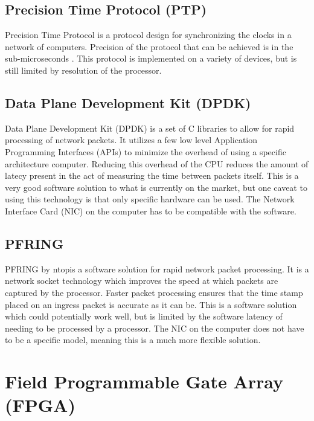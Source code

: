 \subsection{Precision Time Protocol (PTP)}

Precision Time Protocol is a protocol design for synchronizing the clocks in a network of computers.
Precision of the protocol that can be achieved is in the sub-microseconds \cite{ieee1588}. 
This protocol is implemented on a variety of devices, but is still limited by resolution of the processor.

\subsection{Data Plane Development Kit (DPDK)}

\par Data Plane Development Kit (DPDK) is a set of C libraries to allow for rapid processing of network packets.
It utilizes a few low level Application Programming Interfaces (APIs) to minimize the overhead of using a specific architecture computer.
Reducing this overhead of the CPU reduces the amount of latecy present in the act of measuring the time between packets itself.
This is a very good software solution to what is currently on the market, but one caveat to using this technology is that only specific hardware can be used.
The Network Interface Card (NIC) on the computer has to be compatible with the software.

\subsection{PF\textunderscore RING}

\par PF\textunderscore RING by ntop\texttrademark is a software solution for rapid network packet processing.
It is a network socket technology which improves the speed at which packets are captured by the processor.
Faster packet processing ensures that the time stamp placed on an ingress packet is accurate as it can be.
This is a software solution which could potentially work well, but is limited by the software latency of needing to be processed by a processor.
The NIC on the computer does not have to be a specific model, meaning this is a much more flexible solution.


\section{Field Programmable Gate Array (FPGA)}

